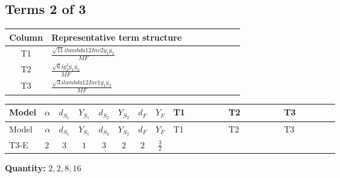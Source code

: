 \documentclass[8pt]{article}
\begin{document}
\begin{landscape}
\subsection*{Terms 2 of 3}
\begin{center}
\begin{tabular}{@{}c >{\raggedright\arraybackslash}p{0.82\linewidth}@{}}
\toprule
Column & Representative term structure \\
\midrule
T1 & \(\displaystyle \frac{\sqrt{11} i lambda12Inv2 \overline{y_{1}} \overline{y_{2}}}{MF}\) \\
\midrule
T2 & \(\displaystyle \frac{\sqrt{6} i g_{2}^{2} \overline{y_{1}} \overline{y_{2}}}{MF}\) \\
\midrule
T3 & \(\displaystyle \frac{\sqrt{3} i lambda12Inv1 \overline{y_{1}} \overline{y_{2}}}{MF}\) \\
\midrule
\bottomrule
\end{tabular}
\end{center}
\smallskip
\tiny
\begin{longtable}{@{}llcccccc >{\raggedright\arraybackslash}p{0.21\linewidth} >{\raggedright\arraybackslash}p{0.21\linewidth} >{\raggedright\arraybackslash}p{0.21\linewidth}@{}}
\toprule
Model & $\alpha$ & $d_{S_1}$ & $Y_{S_1}$ & $d_{S_2}$ & $Y_{S_2}$ & $d_F$ & $Y_F$ & T1 & T2 & T3 \\
\midrule
\endfirsthead
\toprule
Model & $\alpha$ & $d_{S_1}$ & $Y_{S_1}$ & $d_{S_2}$ & $Y_{S_2}$ & $d_F$ & $Y_F$ & T1 & T2 & T3 \\
\midrule
\endhead
T3-E & $2$ & $3$ & $1$ & $3$ & $2$ & $2$ & $\frac{3}{2}$ & \scriptsize\adjustbox{max width=\linewidth}{$\begin{gathered} - \frac{3 \sqrt{11} i lambda12Inv2 \overline{y_{1}} \overline{y_{2}}}{22 MF}\end{gathered}$} & \scriptsize\adjustbox{max width=\linewidth}{$\begin{gathered} - \frac{\sqrt{6} i g_{2}^{2} \overline{y_{1}} \overline{y_{2}}}{3 MF}\end{gathered}$} & \scriptsize\adjustbox{max width=\linewidth}{$\begin{gathered} \frac{\sqrt{3} i lambda12Inv1 \overline{y_{1}} \overline{y_{2}}}{6 MF}\end{gathered}$} \\
\midrule
\bottomrule
\end{longtable}
\clearpage
\noindent\textbf{Quantity: }$\mathrm{2,2,8,16}$\par\smallskip

\end{landscape}
\end{document}
